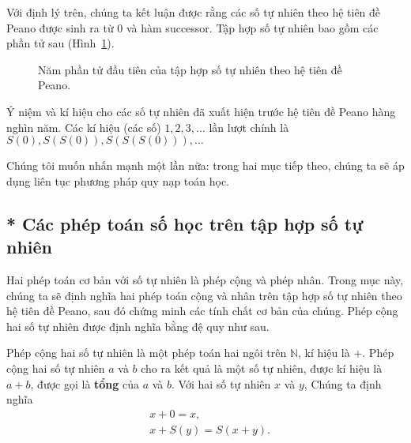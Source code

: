 Với định lý trên, chúng ta kết luận được rằng các số tự nhiên theo hệ tiên đề Peano được sinh ra từ $0$ và hàm successor. Tập hợp số tự nhiên bao gồm các phần tử sau (Hình~\ref{fig:first-five-natural-numbers}).
\begin{figure}[htp]
    \centering
    \caption{Năm phần tử đầu tiên của tập hợp số tự nhiên theo hệ tiên đề Peano.}\label{fig:first-five-natural-numbers}
\end{figure}

Ý niệm và kí hiệu cho các số tự nhiên đã xuất hiện trước hệ tiên đề Peano hàng nghìn năm. Các kí hiệu (các số) $1, 2, 3,\ldots$ lần lượt chính là $S(0), S(S(0)), S(S(S(0))),\ldots$

Chúng tôi muốn nhấn mạnh một lần nữa: trong hai mục tiếp theo, chúng ta sẽ áp dụng liên tục phương pháp quy nạp toán học.

\subsection{* Các phép toán số học trên tập hợp số tự nhiên}

Hai phép toán cơ bản với số tự nhiên là phép cộng và phép nhân. Trong mục này, chúng ta sẽ định nghĩa hai phép toán cộng và nhân trên tập hợp số tự nhiên theo hệ tiên đề Peano, sau đó chứng minh các tính chất cơ bản của chúng. Phép cộng hai số tự nhiên được định nghĩa bằng đệ quy như sau.

\begin{definition}
    Phép cộng hai số tự nhiên là một phép toán hai ngôi trên $\mathbb{N}$, kí hiệu là $+$. Phép cộng hai số tự nhiên $a$ và $b$ cho ra kết quả là một số tự nhiên, được kí hiệu là $a + b$, được gọi là \textbf{tổng} của $a$ và $b$. Với hai số tự nhiên $x$ và $y$, Chúng ta định nghĩa
    \begin{align*}
         & x + 0 = x,           \\
         & x + S(y) = S(x + y).
    \end{align*}
\end{definition}


